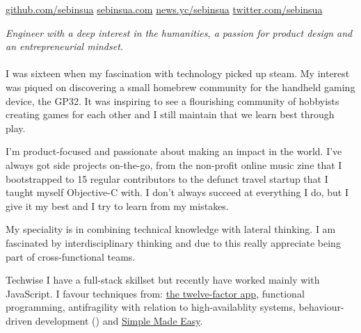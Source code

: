 \documentclass[10pt,a4paper]{article}
\begin{document}
\sloppy  %


\nobreakvspace{0.3em}  %

\noindent\href{http://github.com/sebinsua}{github.com/sebinsua}\sbull
\href{http://sebinsua.com}{sebinsua.com}\sbull
\href{https://news.ycombinator.com/user?id=lhnz}{news.yc/sebinsua}\sbull
\href{http://twitter.com/sebinsua}{twitter.com/sebinsua}

\spacedhrule{0.9em}{-0.4em}  %


\vspace{-1.3em}  %
\begin{multicols}{2}  %
\noindent \emph{Engineer with a deep interest in the humanities, a passion for product design and an entrepreneurial mindset.}
\\
\\
I was sixteen when my fascination with technology picked up steam. My interest was piqued on discovering a small homebrew community for the handheld gaming device, the GP32. It was inspiring to see a flourishing community of hobbyists creating games for each other and I still maintain that we learn best through play.\newline

I'm product-focused and passionate about making an impact in the world. I've always got side projects on-the-go, from the non-profit online music zine that I bootstrapped to 15 regular contributors to the defunct travel startup that I taught myself Objective-C with. I don't always succeed at everything I do, but I give it my best and I try to learn from my mistakes.\newline

My speciality is in combining technical knowledge with lateral thinking. I am fascinated by interdisciplinary thinking and due to this really appreciate being part of cross-functional teams.\newline

Techwise I have a full-stack skillset but recently have worked mainly with JavaScript. I favour techniques from: \href{http://12factor.net}{the twelve-factor app}, functional programming, antifragility with relation to high-availablity systems, behaviour-driven development () and \href{http://infoq.com/presentations/Simple-Made-Easy}{Simple Made Easy}.\newline

\end{multicols}
\end{document}
